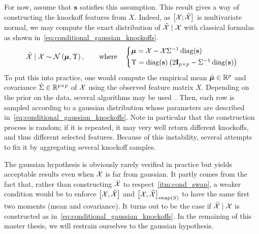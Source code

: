 For now, assume that $\mathbf{s}$ satisfies this assumption.
This result gives a way of constructing the knockoff features from $X$.
Indeed, as $\big[ \mathcal{X}; \tilde{\mathcal{X}} \big]$ is multivariate normal, we may compute the exact distribution of
$\tilde{\mathcal{X}} \mid \mathcal{X}$ with classical formulas~\cite{conditional_normal} as shown in~\ref{eq:conditional_gaussian_knockoffs}.
\begin{equation}\label{eq:conditional_gaussian_knockoffs}
    \tcX \mid \cX \sim \cN\left( \bmu, \Upsilon \right)
    ,\qquad\text{where}\quad
    \begin{cases*}
        \bmu = \cX - \cX\Sigma^{-1}\diag(\bs)\\
        \Upsilon = \diag(\bs)\left( 2\mI_{p \times p} - \Sigma^{-1}\diag(\bs) \right)
    \end{cases*}
\end{equation}
To put this into practice, one would compute the empirical mean
$\hat{\bm{\mu}} \in \mathbb{R}^p$ and covariance $\hat{\Sigma} \in \mathbb{R}^{p \times p}$ of $\mathcal{X}$
using the observed feature matrix $X$.
Depending on the prior on the data, several algorithms may be used~\cite{ledoit_wolf}.
Then, each row is sampled according to a gaussian distribution whose parameters are described
in~\ref{eq:conditional_gaussian_knockoffs}.
Note in particular that the construction process is random;
if it is repeated, it may very well return different knockoffs, and thus different
selected features.
Because of this instability, several attempts~\cite{improve_stability_knockoffs} to fix it by
aggregating several knockoff samples.

The gaussian hypothesis is obviously rarely verified in practice but yields acceptable results even when
$\mathcal{X}$ is far from gaussian.
It partly comes from the fact that, rather than constructing $\tilde{\mathcal{X}}$ to respect~\ref{itm:cond_swap},
a weaker condition would be to enforce $\big[ \mathcal{X}, \tilde{\mathcal{X}} \big]$ and $\big[ \mathcal{X}, \tilde{\mathcal{X}} \big]_{\operatorname{swap}(S)}$ to have the
same first two moments (mean and covariance).
It turns out to be the case if $\tilde{\mathcal{X}} \mid \mathcal{X}$ is constructed as in~\ref{eq:conditional_gaussian_knockoffs}.
In the remaining of this master thesis, we will restrain ourselves to the gaussian hypothesis.

